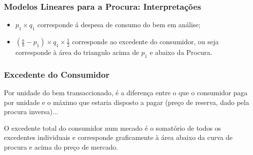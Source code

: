 \begin{frame}
	\frametitle{Modelos Lineares para a Procura: Interpreta\c c\~oes}
	\begin{center}
	\end{center}
	{\footnotesize
	\begin{itemize}
		\item $p_1\times q_1$ corresponde \'a {\color{red} despesa} de consumo do bem em an\'alise;
		\item $\left(\frac{a}{b}-p_1\right)\times q_1 \times\frac{1}{2}$ corresponde ao {\color{green} excedente} do consumidor, ou seja corresponde \`a \'area do triangulo acima de $p_1$ e abaixo da Procura.
	\end{itemize}
	}
\end{frame}

\begin{frame}
	\frametitle{Excedente do Consumidor}
	Por unidade do bem transaccionado, \'e a diferen\c ca entre o que o consumidor paga por unidade e o m\'aximo que estaria disposto a pagar (pre\c co de reserva, dado pela procura inversa)...

	\vspace{1cm}

	O excedente total do consumidor num mecado \'e o somat\'orio de todos os excedentes individuais e corresponde graficamente \`a \'area abaixo da curva de procura e acima do pre\c co de mercado.
\end{frame}